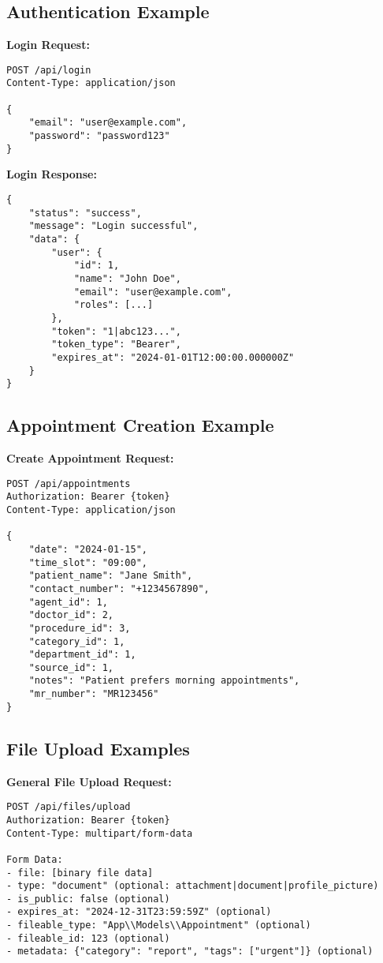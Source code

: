 \documentclass[12pt,a4paper]{article}
\begin{document}
\subsection{Authentication Example}

\textbf{Login Request:}
\begin{lstlisting}
POST /api/login
Content-Type: application/json

{
    "email": "user@example.com",
    "password": "password123"
}
\end{lstlisting}

\textbf{Login Response:}
\begin{lstlisting}
{
    "status": "success",
    "message": "Login successful",
    "data": {
        "user": {
            "id": 1,
            "name": "John Doe",
            "email": "user@example.com",
            "roles": [...]
        },
        "token": "1|abc123...",
        "token_type": "Bearer",
        "expires_at": "2024-01-01T12:00:00.000000Z"
    }
}
\end{lstlisting}

\subsection{Appointment Creation Example}

\textbf{Create Appointment Request:}
\begin{lstlisting}
POST /api/appointments
Authorization: Bearer {token}
Content-Type: application/json

{
    "date": "2024-01-15",
    "time_slot": "09:00",
    "patient_name": "Jane Smith",
    "contact_number": "+1234567890",
    "agent_id": 1,
    "doctor_id": 2,
    "procedure_id": 3,
    "category_id": 1,
    "department_id": 1,
    "source_id": 1,
    "notes": "Patient prefers morning appointments",
    "mr_number": "MR123456"
}
\end{lstlisting}

\subsection{File Upload Examples}

\textbf{General File Upload Request:}
\begin{lstlisting}
POST /api/files/upload
Authorization: Bearer {token}
Content-Type: multipart/form-data

Form Data:
- file: [binary file data]
- type: "document" (optional: attachment|document|profile_picture)
- is_public: false (optional)
- expires_at: "2024-12-31T23:59:59Z" (optional)
- fileable_type: "App\\Models\\Appointment" (optional)
- fileable_id: 123 (optional)
- metadata: {"category": "report", "tags": ["urgent"]} (optional)
\end{lstlisting}
\end{document}
